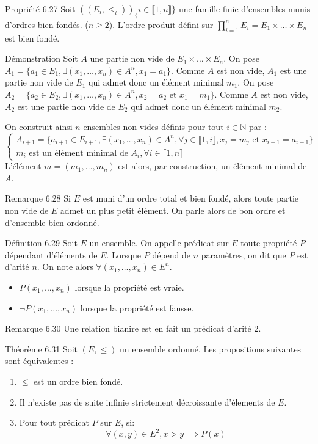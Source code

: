 \documentclass{article}
\begin{document}
\begin{adjustwidth}{-3cm}{-3cm}
    Propriété 6.27
    Soit $((E_i,\leq_i))_\{i \in \llbracket 1,n \rrbracket \}$ une famille finie d'ensembles munis d'ordres bien fondés. ($n \geq 2$). L'ordre produit défini sur $\displaystyle \prod_{i=1}^{n}E_i = E_1 \times \ldots \times E_n$ est bien fondé.

    Démonstration Soit $A$ une partie non vide de $E_1 \times \ldots \times E_n$.
    On pose $A_1 = \{a_1 \in E_1, \exists (x_1,\ldots,x_n) \in A^n, x_1 = a_1\}$. Comme $A$ est non vide, $A_1$ est une partie non vide de $E_1$ qui admet donc un élément minimal $m_1$.
    On pose $A_2 = \{a_2 \in E_2, \exists (x_1,\ldots,x_n) \in A^n, x_2 = a_2 \text{ et } x_1 = m_1\}$. Comme $A$ est non vide, $A_2$ est une partie non vide de $E_2$ qui admet donc un élément minimal $m_2$. 

    On construit ainsi $n$ ensembles non vides définis pour tout $i \in \mathbb{N}$ par : 
    $$\begin{cases}
        A_{i+1} = \{a_{i+1} \in E_{i+1}, \exists (x_1, \ldots, x_n) \in A^n, \forall j \in \llbracket 1, i \rrbracket, x_j = m_j \text{ et } x_{i+1} = a_{i+1}\} \\
        m_i \text{ est un élément minimal de } A_i, \forall i \in \llbracket 1,n \rrbracket 
    \end{cases}$$
    L'élément $m = (m_1, \ldots, m_n)$ est alors, par construction, un élément minimal de $A$.

    Remarque 6.28
    Si $E$ est muni d'un ordre total et bien fondé, alors toute partie non vide de $E$ admet un plus petit élément. On parle alors de bon ordre et d'ensemble bien ordonné.

    Définition 6.29
    Soit $E$ un ensemble. On appelle prédicat sur $E$ toute propriété $P$ dépendant d'éléments de $E$.
    Lorsque $P$ dépend de $n$ paramètres, on dit que $P$ est d'arité $n$. On note alors $\forall (x_1, \ldots, x_n) \in E^n$. \begin{itemize}
        \item $P(x_1,...,x_n)$ lorsque la propriété est vraie.
        \item $\lnot P(x_1,...,x_n)$ lorsque la propriété est fausse.
    \end{itemize}

    Remarque 6.30
    Une relation bianire est en fait un prédicat d'arité 2.

    Théorème 6.31
    Soit $(E,\leq)$ un ensemble ordonné. Les propositions suivantes sont équivalentes : \begin{enumerate}
        \item $\leq$ est un ordre bien fondé.
        \item Il n'existe pas de suite infinie strictement décroissante d'élements de $E$.
        \item Pour tout prédicat $P$ sur $E$, si: $$\forall (x,y) \in E^2, x > y \implies P(x)$$
    \end{enumerate}


\end{adjustwidth}
\end{document}
